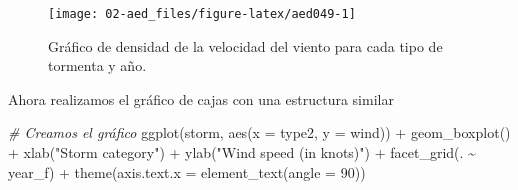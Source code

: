 \documentclass[
]{book}
\newenvironment{Shaded}{\begin{snugshade}}{\end{snugshade}}
\newcommand{\AttributeTok}[1]{\textcolor[rgb]{0.77,0.63,0.00}{#1}}
\newcommand{\CommentTok}[1]{\textcolor[rgb]{0.56,0.35,0.01}{\textit{#1}}}
\newcommand{\DecValTok}[1]{\textcolor[rgb]{0.00,0.00,0.81}{#1}}
\newcommand{\FunctionTok}[1]{\textcolor[rgb]{0.00,0.00,0.00}{#1}}
\newcommand{\NormalTok}[1]{#1}
\newcommand{\OtherTok}[1]{\textcolor[rgb]{0.56,0.35,0.01}{#1}}
\newcommand{\SpecialCharTok}[1]{\textcolor[rgb]{0.00,0.00,0.00}{#1}}
\newcommand{\StringTok}[1]{\textcolor[rgb]{0.31,0.60,0.02}{#1}}
\begin{document}
\begin{Shaded}
\end{Shaded}

\begin{figure}

{\centering \texttt{[image: 02-aed\_files/figure-latex/aed049-1]} 

}

\caption{Gráfico de densidad de la velocidad del viento para cada tipo de tormenta y año.}\label{fig:aed049}
\end{figure}

Ahora realizamos el gráfico de cajas con una estructura similar

\begin{Shaded}
\begin{Highlighting}[]
\CommentTok{\# Creamos el gráfico}
\FunctionTok{ggplot}\NormalTok{(storm, }\FunctionTok{aes}\NormalTok{(}\AttributeTok{x =}\NormalTok{ type2, }\AttributeTok{y =}\NormalTok{ wind))  }\SpecialCharTok{+}
  \FunctionTok{geom\_boxplot}\NormalTok{() }\SpecialCharTok{+} 
  \FunctionTok{xlab}\NormalTok{(}\StringTok{"Storm category"}\NormalTok{) }\SpecialCharTok{+}
  \FunctionTok{ylab}\NormalTok{(}\StringTok{"Wind speed (in knots)"}\NormalTok{) }\SpecialCharTok{+}
  \FunctionTok{facet\_grid}\NormalTok{(. }\SpecialCharTok{\textasciitilde{}}\NormalTok{ year\_f) }\SpecialCharTok{+}
  \FunctionTok{theme}\NormalTok{(}\AttributeTok{axis.text.x =} \FunctionTok{element\_text}\NormalTok{(}\AttributeTok{angle =} \DecValTok{90}\NormalTok{))}
\end{Highlighting}
\end{Shaded}
\end{document}
